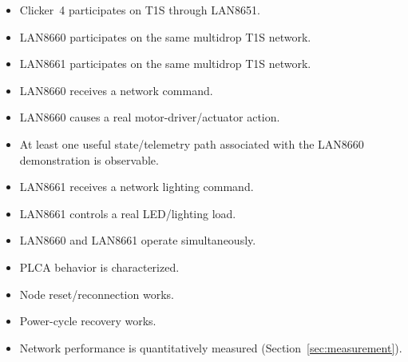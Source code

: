 \begin{itemize}[itemsep=0.1em, label={$\square$}]
\item Clicker~4 participates on T1S through LAN8651.
\item LAN8660 participates on the same multidrop T1S network.
\item LAN8661 participates on the same multidrop T1S network.
\item LAN8660 receives a network command.
\item LAN8660 causes a real motor-driver/actuator action.
\item At least one useful state/telemetry path associated with the LAN8660 demonstration is observable.
\item LAN8661 receives a network lighting command.
\item LAN8661 controls a real LED/lighting load.
\item LAN8660 and LAN8661 operate simultaneously.
\item PLCA behavior is characterized.
\item Node reset/reconnection works.
\item Power-cycle recovery works.
\item Network performance is quantitatively measured (Section~\ref{sec:measurement}).
\end{itemize}
